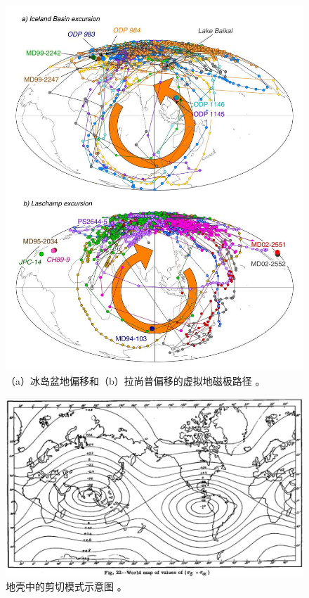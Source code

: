 \documentclass[10pt,twocolumn,letterpaper]{article}
\begin{document}
\begin{figure}[t]
\begin{center}
   \includegraphics[width=0.95\linewidth]{laj.jpg}
\end{center}
   \caption{（a）冰岛盆地偏移和（b）拉尚普偏移的虚拟地磁极路径 \cite{35}。}
\label{fig:7}
\label{fig:onecol}
\end{figure}

\begin{figure}[t]
\begin{center}
   \includegraphics[width=1\linewidth]{meinesz3.jpg}
\end{center}
   \caption{地壳中的剪切模式示意图 \cite{36}。}
\label{fig:8}
\label{fig:onecol}
\end{figure}
\end{document}
